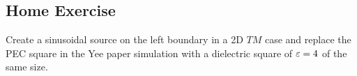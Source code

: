\documentclass[12pt]{article}
\begin{document}
\subsection*{Home Exercise}

\begin{mdframed}[backgroundcolor=blue!20]
Create a sinusoidal source on the left boundary in a 2D $TM$ case and replace the PEC square in the Yee paper simulation with a dielectric square of $\varepsilon = 4$ of the same size.
\end{mdframed}



\end{document}
